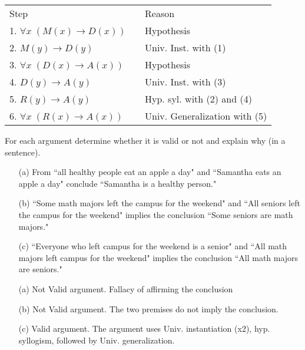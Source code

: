 \begin{questions}
\begin{solution}
\begin{itemize}[itemsep=0pt,parsep=0pt,topsep=0pt,partopsep=0pt]
    \smallskip
    \begin{tabular}{lll}
        Step        & \hspace{0.2in} & Reason \\
        1. $\forall x\;(M(x) \rightarrow D(x))$     &   & Hypothesis \\
        2. $M(y) \rightarrow D(y)$                  & & Univ. Inst. with (1) \\
        3. $\forall x\; (D(x) \rightarrow A(x))$    &   & Hypothesis \\
        4. $D(y) \rightarrow A(y)$                  &   & Univ. Inst. with (3) \\
        5. $R(y) \rightarrow A(y)$                  &   & Hyp. syl. with (2) and (4) \\
        6. $\forall x\;(R(x) \rightarrow A(x))$     &   & Univ. Generalization with (5) \\
    \end{tabular}
    \end{itemize}
  \end{solution}



 For each argument determine whether it is valid or not and explain why (in a sentence).
    \begin{itemize}[itemsep=0pt,parsep=0pt,topsep=0pt,partopsep=0pt]
    \item[(a)] From  ``all healthy people eat an apple a day" and  ``Samantha eats an apple a day" conclude ``Samantha is a healthy person."  
    \item[(b)] ``Some math majors left the campus for the weekend" and ``All seniors left the campus for the weekend" implies the conclusion ``Some seniors are math majors."
    \item[(c)] ``Everyone who left campus for the weekend is a senior" and ``All math majors left campus for the weekend"  implies the conclusion ``All math majors are seniors." 
    \end{itemize}
   \ifprintanswers
        \vspace{-20pt}
    \fi
\begin{solution}
    \begin{itemize}
        \item[(a)] Not Valid argument.  Fallacy of affirming the conclusion
        \item[(b)] Not Valid argument.  The two premises do not imply the conclusion.
        \item[(c)] Valid argument. The argument uses Univ. instantiation (x2), hyp. syllogism, followed by Univ. generalization.
    \end{itemize}
\end{solution}




\end{questions}
